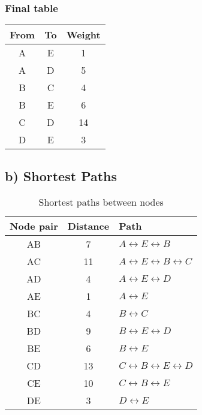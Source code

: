 \documentclass[a4paper, 11 pt, article, accentcolor=tud7b]{tudreport}
\begin{document}
	\subsubsection*{Final table}
	\begin{tabular}{| c | c | c |}
	  \hline
	  From & To & Weight \\ \hline
	  A & E & 1 \\ \hline
	  A & D & 5 \\ \hline
	  B & C & 4 \\ \hline
	  B & E & 6 \\ \hline
	  C & D & 14 \\ \hline
	  D & E & 3 \\ \hline
	\end{tabular}

	\newpage
	
	\subsection*{b) Shortest Paths}
	
	\begin{table}[h]
	  \centering
	  \begin{tabular}{| c | c | l |}
	    \hline
	    Node pair & Distance & Path \\ \hline
	    AB        & 7        & $A \leftrightarrow E \leftrightarrow  B$ \\ \hline
	    AC        & 11       & $A \leftrightarrow E \leftrightarrow B \leftrightarrow C$ \\ \hline
	    AD        & 4        & $A \leftrightarrow E \leftrightarrow D$ \\ \hline
	    AE        & 1        & $A \leftrightarrow E$ \\ \hline
	    BC        & 4        & $B \leftrightarrow C$ \\ \hline
	    BD        & 9        & $B \leftrightarrow E \leftrightarrow D$ \\ \hline
	    BE        & 6        & $B \leftrightarrow E$ \\ \hline
	    CD        & 13       & $C \leftrightarrow B \leftrightarrow E \leftrightarrow D$ \\ \hline
	    CE        & 10       & $C \leftrightarrow B \leftrightarrow E$\\ \hline
	    DE        & 3        & $D \leftrightarrow E$ \\ \hline
	  \end{tabular}
	  \caption{Shortest paths between nodes}
	\end{table}
	
\end{document}
